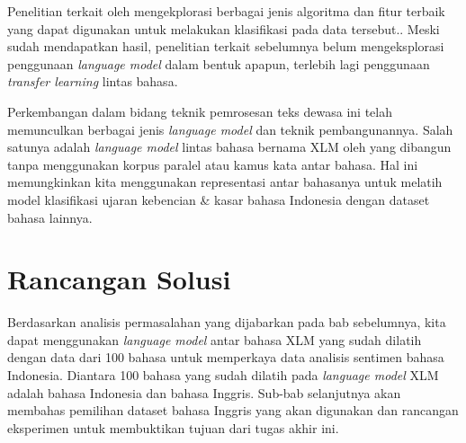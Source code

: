 	Penelitian terkait oleh \parencite{Ibrohim_Budi_2019} mengekplorasi berbagai jenis algoritma dan fitur terbaik yang dapat digunakan untuk melakukan klasifikasi pada data tersebut.. Meski sudah mendapatkan hasil, penelitian terkait sebelumnya belum mengeksplorasi penggunaan \textit{language model} dalam bentuk apapun, terlebih lagi penggunaan \textit{transfer learning} lintas bahasa.

	Perkembangan dalam bidang teknik pemrosesan teks dewasa ini telah memunculkan berbagai jenis \textit{language model} dan teknik pembangunannya. Salah satunya adalah \textit{language model} lintas bahasa bernama XLM oleh \parencite{LampleConneau2019} yang dibangun tanpa menggunakan korpus paralel atau kamus kata antar bahasa. Hal ini memungkinkan kita menggunakan representasi antar bahasanya untuk melatih model klasifikasi ujaran kebencian \& kasar bahasa Indonesia dengan dataset bahasa lainnya.






\section{Rancangan Solusi}
	Berdasarkan analisis permasalahan yang dijabarkan pada bab sebelumnya, kita dapat menggunakan \textit{language model} antar bahasa XLM yang sudah dilatih dengan data dari 100 bahasa untuk memperkaya data analisis sentimen bahasa Indonesia. Diantara 100 bahasa yang sudah dilatih pada \textit{language model} XLM adalah bahasa Indonesia dan bahasa Inggris. Sub-bab selanjutnya akan membahas pemilihan dataset bahasa Inggris yang akan digunakan dan rancangan eksperimen untuk membuktikan tujuan dari tugas akhir ini.

